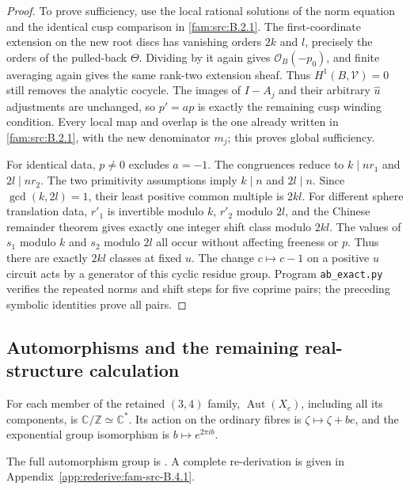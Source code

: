 \begin{proof}
To prove sufficiency, use the local rational solutions of the norm equation and the identical cusp comparison in \ref{fam:src:B.2.1}. The first-coordinate extension on the new root discs has vanishing orders $2k$ and $l$, precisely the orders of the pulled-back $\Theta$. Dividing by it again gives $\mathcal O_B(-p_0)$, and finite averaging again gives the same rank-two extension sheaf. Thus $H^1(B,\mathcal V)=0$ still removes the analytic cocycle. The images of $I-A_j$ and their arbitrary $\widehat u$ adjustments are unchanged, so $p'=ap$ is exactly the remaining cusp winding condition. Every local map and overlap is the one already written in \ref{fam:src:B.2.1}, with the new denominator $m_j$; this proves global sufficiency.

For identical data, $p\ne0$ excludes $a=-1$. The congruences reduce to $k\mid nr_1$ and $2l\mid nr_2$. The two primitivity assumptions imply $k\mid n$ and $2l\mid n$. Since $\gcd(k,2l)=1$, their least positive common multiple is $2kl$. For different sphere translation data, $r'_1$ is invertible modulo $k$, $r'_2$ modulo $2l$, and the Chinese remainder theorem gives exactly one integer shift class modulo $2kl$. The values of $s_1$ modulo $k$ and $s_2$ modulo $2l$ all occur without affecting freeness or $p$. Thus there are exactly $2kl$ classes at fixed $u$. The change $c\mapsto c-1$ on a positive $u$ circuit acts by a generator of this cyclic residue group. Program \texttt{ab\_exact.py} verifies the repeated norms and shift steps for five coprime pairs; the preceding symbolic identities prove all pairs.
\end{proof}

\subsection{Automorphisms and the remaining real-structure calculation}\label{fam:section:B.4}

\begin{proposition}\label{fam:src:B.4.1}\label{fam:st:B.4.1}
For each member of the retained $(3,4)$ family, $\operatorname{Aut}(X_c)$, including all its components, is $\mathbb C/\mathbb Z\simeq\mathbb C^*$. Its action on the ordinary fibres is $\zeta\mapsto\zeta+be$, and the exponential group isomorphism is $b\mapsto e^{2\pi ib}$.
\end{proposition}


The full automorphism group is \citet[Theorem~1.4]{DuEtAl2026v1}. A complete re-derivation is given in Appendix~\ref{app:rederive:fam-src-B.4.1}.



